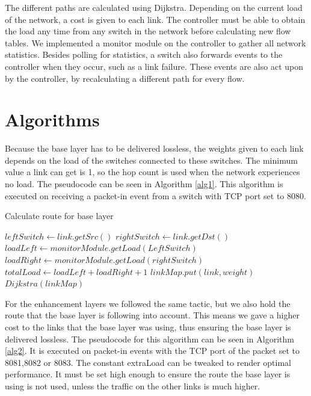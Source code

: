 \documentclass[conference]{IEEEtran}
\begin{document}
The different paths are calculated using Dijkstra. 
Depending on the current load of the network, a cost is given to each link.
The controller must be able to obtain the load any time from any switch in the network before calculating 
new flow tables. We implemented a monitor module on the controller to gather all network 
statistics. Besides polling for statistics, a switch also forwards events to the controller when 
they occur, such as a link failure. These events are also act upon by the controller, 
by recalculating a different path for every flow.

\section{Algorithms}

Because the base layer has to be delivered lossless, the weights given to each link depends 
on the load of the switches connected to these switches.
The minimum value a link can get is 1, so the hop count is used when the network experiences no load.
The pseudocode can be seen in Algorithm \ref{alg1}. This algorithm is executed on receiving a packet-in event 
from a switch with TCP port set to 8080.

\begin{algorithm}
\caption{Calculate route for base layer}
\label{alg1}
\begin{algorithmic}
\STATE $leftSwitch \leftarrow link.getSrc()$
\STATE $rightSwitch \leftarrow link.getDst()$
\STATE $loadLeft \leftarrow monitorModule.getLoad(LeftSwitch)$
\STATE $loadRight \leftarrow monitorModule.getLoad(rightSwitch)$
\STATE $totalLoad \leftarrow loadLeft + loadRight + 1$
\STATE $linkMap.put(link,weight)$
\ENDFOR
$Dijkstra(linkMap)$
\end{algorithmic}
\end{algorithm}

For the enhancement layers we followed the same tactic, but we also hold the route that the 
base layer is following into account. This means we gave a higher cost to the links that the base layer was using, 
thus ensuring the base layer is delivered lossless. The pseudocode for this algorithm can be seen in Algorithm \ref{alg2}.
It is executed on packet-in events with the TCP port of the packet set to 8081,8082 or 8083.
The constant extraLoad can be tweaked to render optimal performance. It must be set high enough to ensure 
the route the base layer is using is not used, unless the traffic on the other links is much higher.
\end{document}

